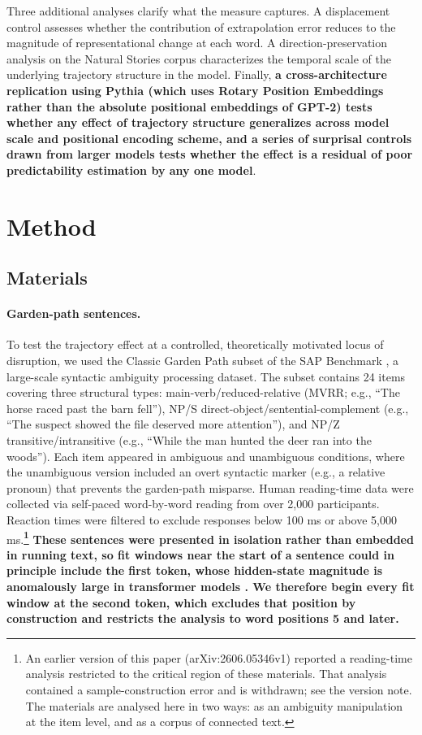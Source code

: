 \documentclass[12pt]{article}
\newcommand{\new}[1]{{\bfseries #1}}
\begin{document}
Three additional analyses clarify what the measure captures. A displacement control assesses whether the contribution of extrapolation error reduces to the magnitude of representational change at each word. A direction-preservation analysis on the Natural Stories corpus characterizes the temporal scale of the underlying trajectory structure in the model. Finally, \new{a cross-architecture replication using Pythia (which uses Rotary Position Embeddings rather than the absolute positional embeddings of GPT-2) tests whether any effect of trajectory structure generalizes across model scale and positional encoding scheme, and a series of surprisal controls drawn from larger models tests whether the effect is a residual of poor predictability estimation by any one model}.

\section{Method}

\subsection{Materials}

\paragraph{Garden-path sentences.} To test the trajectory effect at a controlled, theoretically motivated locus of disruption, we used the Classic Garden Path subset of the SAP Benchmark \citep{huang2024}, a large-scale syntactic ambiguity processing dataset. The subset contains 24 items covering three structural types: main-verb/reduced-relative (MVRR; e.g., ``The horse raced past the barn fell''), NP/S direct-object/sentential-complement (e.g., ``The suspect showed the file deserved more attention''), and NP/Z transitive/intransitive (e.g., ``While the man hunted the deer ran into the woods''). Each item appeared in ambiguous and unambiguous conditions, where the unambiguous version included an overt syntactic marker (e.g., a relative pronoun) that prevents the garden-path misparse. Human reading-time data were collected via self-paced word-by-word reading from over 2,000 participants. Reaction times were filtered to exclude responses below 100 ms or above 5,000 ms.\new{\footnote{An earlier version of this paper (arXiv:2606.05346v1) reported a reading-time analysis restricted to the critical region of these materials. That analysis contained a sample-construction error and is withdrawn; see the version note. The materials are analysed here in two ways: as an ambiguity manipulation at the item level, and as a corpus of connected text.}} \new{These sentences were presented in isolation rather than embedded in running text, so fit windows near the start of a sentence could in principle include the first token, whose hidden-state magnitude is anomalously large in transformer models \citep{xiao2023}. We therefore begin every fit window at the second token, which excludes that position by construction and restricts the analysis to word positions 5 and later.}
\end{document}
